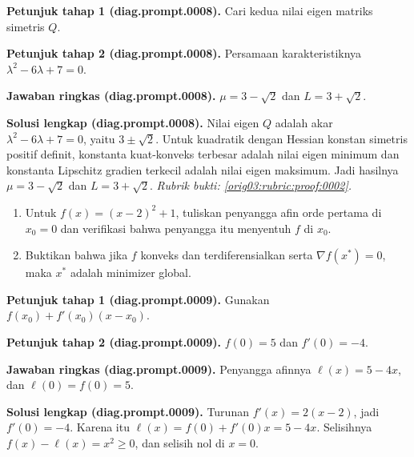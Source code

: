 \par\noindent\textbf{Petunjuk tahap 1 (diag.prompt.0008).}
Cari kedua nilai eigen matriks simetris $Q$.
\label{orig03:diag:hint1:0008}
\par\noindent\textbf{Petunjuk tahap 2 (diag.prompt.0008).}
Persamaan karakteristiknya $\lambda^2-6\lambda+7=0$.
\label{orig03:diag:hint2:0008}
\par\noindent\textbf{Jawaban ringkas (diag.prompt.0008).}
$\mu=3-\sqrt2$ dan $L=3+\sqrt2$.
\label{orig03:diag:answer:0008}
\par\noindent\textbf{Solusi lengkap (diag.prompt.0008).}
Nilai eigen $Q$ adalah akar
$\lambda^2-6\lambda+7=0$, yaitu $3\pm\sqrt2$. Untuk kuadratik dengan Hessian
konstan simetris positif definit, konstanta kuat-konveks terbesar adalah nilai
eigen minimum dan konstanta Lipschitz gradien terkecil adalah nilai eigen
maksimum. Jadi hasilnya $\mu=3-\sqrt2$ dan $L=3+\sqrt2$.
\emph{Rubrik bukti: \ref{orig03:rubric:proof:0002}.}
\label{orig03:diag:solution:0008}

\begin{exercise}
\label{orig03:diag:problem:0005}
\begin{enumerate}
\item\label{orig03:diag:prompt:0009}
Untuk $f(x)=(x-2)^2+1$, tuliskan penyangga afin orde pertama di $x_0=0$
dan verifikasi bahwa penyangga itu menyentuh $f$ di $x_0$.
\item\label{orig03:diag:prompt:0010}
Buktikan bahwa jika $f$ konveks dan terdiferensialkan serta
$\nabla f(x^*)=0$, maka $x^*$ adalah minimizer global.
\end{enumerate}
\end{exercise}

\par\noindent\textbf{Petunjuk tahap 1 (diag.prompt.0009).}
Gunakan $f(x_0)+f'(x_0)(x-x_0)$.
\label{orig03:diag:hint1:0009}
\par\noindent\textbf{Petunjuk tahap 2 (diag.prompt.0009).}
$f(0)=5$ dan $f'(0)=-4$.
\label{orig03:diag:hint2:0009}
\par\noindent\textbf{Jawaban ringkas (diag.prompt.0009).}
Penyangga afinnya $\ell(x)=5-4x$, dan $\ell(0)=f(0)=5$.
\label{orig03:diag:answer:0009}
\par\noindent\textbf{Solusi lengkap (diag.prompt.0009).}
Turunan $f'(x)=2(x-2)$, jadi $f'(0)=-4$. Karena itu
$\ell(x)=f(0)+f'(0)x=5-4x$. Selisihnya
$f(x)-\ell(x)=x^2\geq0$, dan selisih nol di $x=0$.
\label{orig03:diag:solution:0009}

